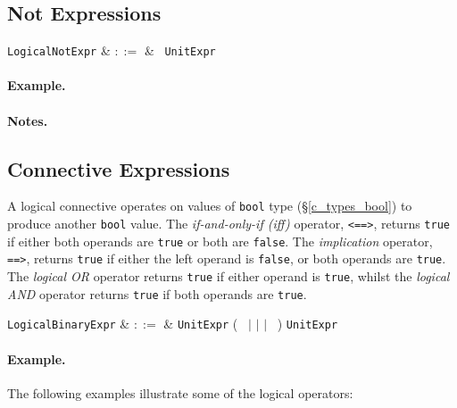 \subsection{Not Expressions}
\label{c_expr_logical_not}

\begin{syntax}
\verb+LogicalNotExpr+ & $::=$ & \token{!}\ \verb+UnitExpr+\\
\end{syntax}

\paragraph{Example.}

\paragraph{Notes.}


\subsection{Connective Expressions}
\label{c_expr_logical_binary}

A logical connective operates on values of \lstinline{bool} type (\S\ref{c_types_bool}) to produce another \lstinline{bool} value.  The {\em if-and-only-if (iff)} operator, \lstinline{<==>}, returns \lstinline{true} if either both operands are \lstinline{true} or both are \lstinline{false}.  The {\em implication} operator, \lstinline{==>}, returns \lstinline{true} if either the left operand is \lstinline{false}, or both operands are \lstinline{true}.  The {\em logical OR} operator returns \lstinline{true} if either operand is \lstinline{true}, whilst the {\em logical AND} operator returns \lstinline{true} if both operands are \lstinline{true}.

\begin{syntax}

  \verb+LogicalBinaryExpr+ & $::=$ & \verb+UnitExpr+ \big(\ \token{<==>} $|$ \token{==>} $|$ \token{\&\&} $|$ \token{||}\ \big) \verb+UnitExpr+\\
\end{syntax}

\paragraph{Example.}  The following examples illustrate some of the logical operators:

